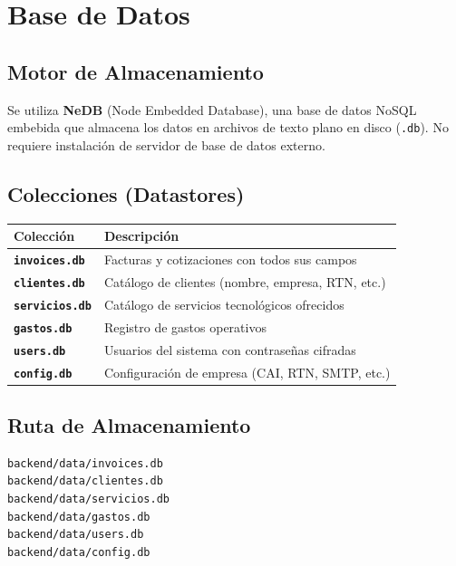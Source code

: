 \documentclass[12pt, letterpaper]{article}
\begin{document}
\section{Base de Datos}

\subsection{Motor de Almacenamiento}

Se utiliza \textbf{NeDB} (Node Embedded Database), una base de datos NoSQL
embebida que almacena los datos en archivos de texto plano en disco
(\texttt{.db}). No requiere instalación de servidor de base de datos externo.

\subsection{Colecciones (Datastores)}

\begin{tabularx}{\linewidth}{>{\bfseries}l X}
  \toprule
  Colección              & Descripción                                        \\
  \midrule
  \texttt{invoices.db}   & Facturas y cotizaciones con todos sus campos       \\
  \texttt{clientes.db}   & Catálogo de clientes (nombre, empresa, RTN, etc.)  \\
  \texttt{servicios.db}  & Catálogo de servicios tecnológicos ofrecidos       \\
  \texttt{gastos.db}     & Registro de gastos operativos                      \\
  \texttt{users.db}      & Usuarios del sistema con contraseñas cifradas      \\
  \texttt{config.db}     & Configuración de empresa (CAI, RTN, SMTP, etc.)    \\
  \bottomrule
\end{tabularx}

\subsection{Ruta de Almacenamiento}

\begin{verbatim}
backend/data/invoices.db
backend/data/clientes.db
backend/data/servicios.db
backend/data/gastos.db
backend/data/users.db
backend/data/config.db
\end{verbatim}
\end{document}
